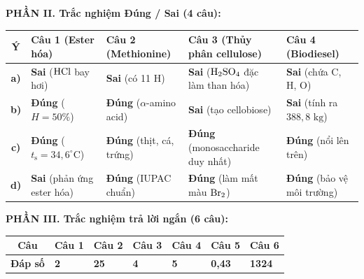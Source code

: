 \documentclass{article}
\begin{document}
\textbf{PHẦN II. Trắc nghiệm Đúng / Sai (4 câu):}\\[2pt]
\begin{tabularx}{\linewidth}{|c|*{4}{>{\centering\arraybackslash}X|}}
\hline
\textbf{Ý} & \textbf{Câu 1 (Ester hóa)} & \textbf{Câu 2 (Methionine)} & \textbf{Câu 3 (Thủy phân cellulose)} & \textbf{Câu 4 (Biodiesel)} \\
\hline
\textbf{a)} & \textbf{Sai} ($\ce{HCl}$ bay hơi) & \textbf{Sai} (có 11 H) & \textbf{Sai} ($\ce{H2SO4}$ đặc làm than hóa) & \textbf{Sai} (chứa C, H, O) \\
\hline
\textbf{b)} & \textbf{\color{brandRed}Đúng} ($H = 50\%$) & \textbf{\color{brandRed}Đúng} ($\alpha$-amino acid) & \textbf{Sai} (tạo cellobiose) & \textbf{Sai} (tính ra $388{,}8\text{ kg}$) \\
\hline
\textbf{c)} & \textbf{\color{brandRed}Đúng} ($t_{\text{s}} = 34{,}6^\circ\text{C}$) & \textbf{\color{brandRed}Đúng} (thịt, cá, trứng) & \textbf{\color{brandRed}Đúng} (monosaccharide duy nhất) & \textbf{\color{brandRed}Đúng} (nổi lên trên) \\
\hline
\textbf{d)} & \textbf{Sai} (phản ứng ester hóa) & \textbf{\color{brandRed}Đúng} (IUPAC chuẩn) & \textbf{\color{brandRed}Đúng} (làm mất màu $\ce{Br2}$) & \textbf{\color{brandRed}Đúng} (bảo vệ môi trường) \\
\hline
\end{tabularx}
\vspace{4pt}

\textbf{PHẦN III. Trắc nghiệm trả lời ngắn (6 câu):}\\[2pt]
\begin{tabularx}{\linewidth}{|c|*{6}{>{\centering\arraybackslash}X|}}
\hline
\textbf{Câu} & \textbf{Câu 1} & \textbf{Câu 2} & \textbf{Câu 3} & \textbf{Câu 4} & \textbf{Câu 5} & \textbf{Câu 6} \\
\hline
\textbf{Đáp số} & \textbf{\color{brandRed}2} & \textbf{\color{brandRed}25} & \textbf{\color{brandRed}4} & \textbf{\color{brandRed}5} & \textbf{\color{brandRed}0,43} & \textbf{\color{brandRed}1324} \\
\hline
\end{tabularx}
\end{document}
